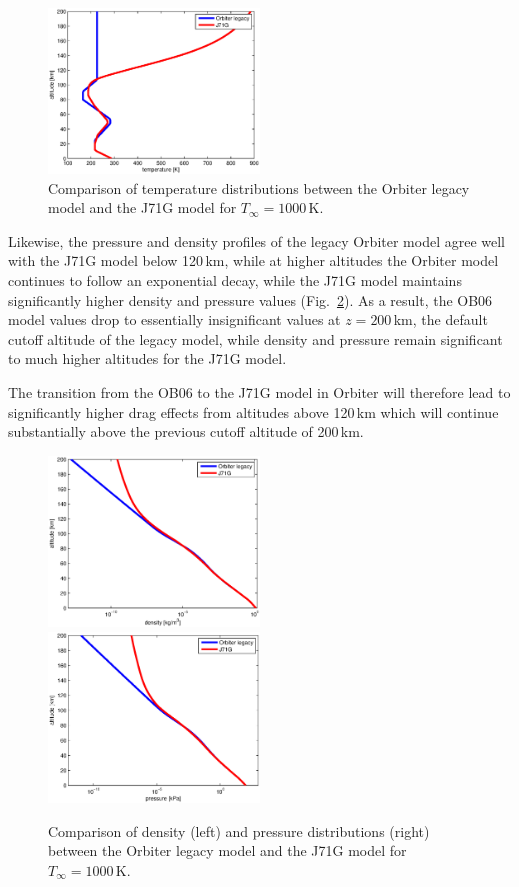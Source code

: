 \documentclass[Orbiter Technical Reference.tex]{subfiles}
\begin{document}
\begin{figure}
\includegraphics[width=0.5\textwidth]{ob_j71g_temp.eps}
\caption{Comparison of temperature distributions between the Orbiter legacy model and the J71G model for $T_\infty=1000$\,K.}
\label{fig:ob_j71g_temp}
\end{figure}
Likewise, the pressure and density profiles of the legacy Orbiter model agree well with the J71G model below 120\,km, while at higher altitudes the Orbiter model continues to follow an exponential decay, while the J71G model maintains significantly higher density and pressure values (Fig.~\ref{fig:ob_j71g_dens_prs}).
As a result, the OB06 model values drop to essentially insignificant values at $z=200$\,km, the default cutoff altitude of the legacy model, while density and pressure remain significant to much higher altitudes for the J71G model.

The transition from the OB06 to the J71G model in Orbiter will therefore lead to significantly higher drag effects from altitudes above 120\,km which will continue substantially above the previous cutoff altitude of 200\,km.

\begin{figure}
\includegraphics[width=0.5\textwidth]{ob_j71g_dens.eps}
\includegraphics[width=0.5\textwidth]{ob_j71g_prs.eps}
\caption{Comparison of density (left) and pressure distributions (right) between the Orbiter legacy model and the J71G model for $T_\infty=1000$\,K.}
\label{fig:ob_j71g_dens_prs}
\end{figure}
\end{document}
